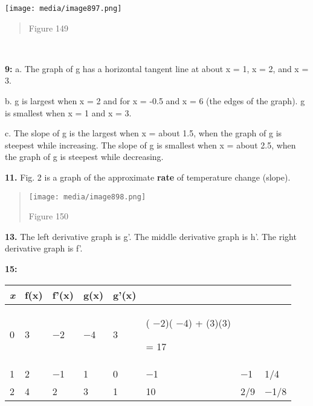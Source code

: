 \texttt{[image: media/image897.png]}

\begin{quote}
Figure 149
\end{quote}

\textbf{\\
}

\textbf{9:} a. The graph of g has a horizontal tangent line at about x =
1, x = 2, and x = 3.

b. g is largest when x = 2 and for x = -0.5 and x = 6 (the edges of the
graph). g is smallest when x = 1 and x = 3.

c. The slope of g is the largest when x = about 1.5, when the graph of g
is steepest while increasing. The slope of g is smallest when x = about
2.5, when the graph of g is steepest while decreasing.

\textbf{11.} Fig. 2 is a graph of the approximate \textbf{rate} of
temperature change (slope).

\begin{quote}
\texttt{[image: media/image898.png]}

Figure 150
\end{quote}

\textbf{13.} The left derivative graph is g'. The middle derivative
graph is h'. The right derivative graph is f'.

\textbf{15: }

\begin{longtable}[]{@{}llllllll@{}}
\toprule
\emph{x} & f(x) & f'(x) & g(x) & g'(x) & & &\tabularnewline
\midrule
\endhead
\begin{minipage}[t]{0.12\columnwidth}\raggedright\strut
0\strut
\end{minipage} & \begin{minipage}[t]{0.12\columnwidth}\raggedright\strut
3\strut
\end{minipage} & \begin{minipage}[t]{0.12\columnwidth}\raggedright\strut
−2\strut
\end{minipage} & \begin{minipage}[t]{0.12\columnwidth}\raggedright\strut
−4\strut
\end{minipage} & \begin{minipage}[t]{0.12\columnwidth}\raggedright\strut
3\strut
\end{minipage} & \begin{minipage}[t]{0.12\columnwidth}\raggedright\strut
( −2)( −4) + (3)(3)

= 17\strut
\end{minipage} & \begin{minipage}[t]{0.12\columnwidth}\raggedright\strut
\strut
\end{minipage} & \begin{minipage}[t]{0.12\columnwidth}\raggedright\strut
\strut
\end{minipage}\tabularnewline
1 & 2 & −1 & 1 & 0 & −1 & −1 & 1/4\tabularnewline
2 & 4 & 2 & 3 & 1 & 10 & 2/9 & −1/8\tabularnewline
\bottomrule
\end{longtable}

